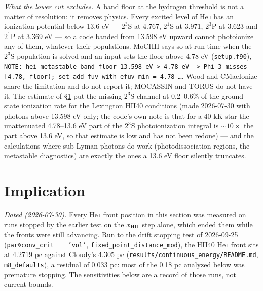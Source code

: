 \documentclass[11pt]{my_memo}
\begin{document}
\emph{What the lower cut excludes.}  A band floor at the hydrogen threshold is not
a matter of resolution: it removes physics.  Every excited level of He\,\textsc{i}
has an ionization potential below 13.6 eV --- $2^3$S at 4.767, $2^1$S at 3.971,
$2^3$P at 3.623 and $2^1$P at 3.369 eV --- so a code banded from 13.598 eV upward
cannot photoionize any of them, whatever their populations.  MoCHII says so at
run time when the $2^3$S population is solved and an input sets the floor above
4.78 eV (\texttt{setup.f90}),
\texttt{NOTE: hei\_metastable band floor 13.598 eV > 4.78 eV -> Phi\_3 misses
[4.78, floor); set add\_fuv with efuv\_min = 4.78 \ldots}.  Wood and CMacIonize
share the limitation and do not report it; MOCASSIN and TORUS do not have it.
The estimate of \S\ref{sec:implication} put the missing $2^3$S channel at
0.2--0.6\% of the ground-state ionization rate for the Lexington HII40
conditions (made 2026-07-30 with photons above 13.598 eV only; the code's own
note is that for a 40 kK star the unattenuated 4.78--13.6 eV part of the $2^3$S
photoionization integral is $\sim10\times$ the part above 13.6 eV, so that
estimate is low and has not been redone) --- and the calculations where
sub-Lyman photons do work (photodissociation regions, the metastable diagnostics)
are exactly the ones a 13.6 eV floor silently truncates.

\section{Implication}\label{sec:implication}
\emph{Dated (2026-07-30).}  Every He\,\textsc{i} front position in this section
was measured on runs stopped by the earlier test on the $x_{\rm HII}$ step alone,
which ended them while the fronts were still advancing.  Run to the drift
stopping test of 2026-09-25 (\texttt{par\%conv\_crit} $=$ \texttt{'vol'},
\texttt{fixed\_point\_distance\_mod}), the HII40 He\,\textsc{i} front sits at
4.2719 pc against Cloudy's 4.305 pc (\texttt{results/continuous\_energy/README.md},
\texttt{m8\_defaults}), a residual of 0.033 pc: most of the 0.18 pc analyzed
below was premature stopping.  The sensitivities below are a record of those
runs, not current bounds.
\end{document}
